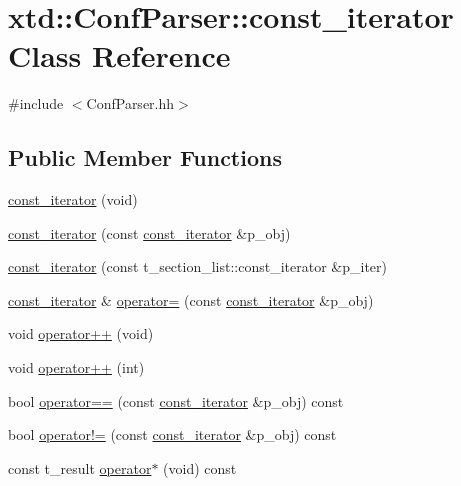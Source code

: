 \hypertarget{classxtd_1_1ConfParser_1_1const__iterator}{\section{xtd\-:\-:Conf\-Parser\-:\-:const\-\_\-iterator Class Reference}
\label{classxtd_1_1ConfParser_1_1const__iterator}
}


{\ttfamily \#include $<$Conf\-Parser.\-hh$>$}

\subsection*{Public Member Functions}
\begin{DoxyCompactItemize}
\item 
\hyperlink{classxtd_1_1ConfParser_1_1const__iterator_a9c17a000740a8558dddb0dd1187939b5}{const\-\_\-iterator} (void)
\item 
\hyperlink{classxtd_1_1ConfParser_1_1const__iterator_af09c45149cd53e97902123aa770c0867}{const\-\_\-iterator} (const \hyperlink{classxtd_1_1ConfParser_1_1const__iterator}{const\-\_\-iterator} \&p\-\_\-obj)
\item 
\hyperlink{classxtd_1_1ConfParser_1_1const__iterator_a0fb34a1a672ceecfc5eb756e712bb977}{const\-\_\-iterator} (const t\-\_\-section\-\_\-list\-::const\-\_\-iterator \&p\-\_\-iter)
\item 
\hyperlink{classxtd_1_1ConfParser_1_1const__iterator}{const\-\_\-iterator} \& \hyperlink{classxtd_1_1ConfParser_1_1const__iterator_acef9a9b328552d35dec3b1736d775cf5}{operator=} (const \hyperlink{classxtd_1_1ConfParser_1_1const__iterator}{const\-\_\-iterator} \&p\-\_\-obj)
\item 
void \hyperlink{classxtd_1_1ConfParser_1_1const__iterator_a6c3a5f37a31973077c3067a8d892aca0}{operator++} (void)
\item 
void \hyperlink{classxtd_1_1ConfParser_1_1const__iterator_a7c5bfdfc6f85ac43469fc6dcd8601b98}{operator++} (int)
\item 
bool \hyperlink{classxtd_1_1ConfParser_1_1const__iterator_a1acb3ce9b1fb4892d77dcd649ec7768a}{operator==} (const \hyperlink{classxtd_1_1ConfParser_1_1const__iterator}{const\-\_\-iterator} \&p\-\_\-obj) const 
\item 
bool \hyperlink{classxtd_1_1ConfParser_1_1const__iterator_a380f55fdaee860e5cc7c4f8fcfade27b}{operator!=} (const \hyperlink{classxtd_1_1ConfParser_1_1const__iterator}{const\-\_\-iterator} \&p\-\_\-obj) const 
\item 
const t\-\_\-result \hyperlink{classxtd_1_1ConfParser_1_1const__iterator_ab148b39b2f0e83242aeae432814eae7d}{operator$\ast$} (void) const 
\end{DoxyCompactItemize}


